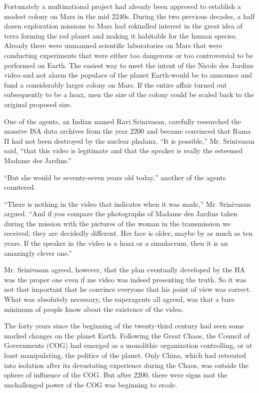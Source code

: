 \documentclass[]{article}
\begin{document}
{Fortunately a multinational project had already been approved to establish a modest colony on Mars in the mid 2240s. During the two previous decades, a half dozen exploration missions to Mars had rekindled interest in the great idea of terra forming the red planet and making it habitable for the human species. Already there were unmanned scientific laboratories on Mars that were conducting experiments that were either too dangerous or too controversial to be performed on Earth. The easiest way to meet the intent of the Nicole des Jardins video-and not alarm the populace of the planet Earth-would be to announce and fund a considerably larger colony on Mars. If the entire affair turned out subsequently to be a hoax, men the size of the colony could be scaled back to the original proposed size.

One of the agents, an Indian named Ravi Srinivasan, carefully researched the massive ISA data archives from the year 2200 and became convinced that Rama II had not been destroyed by the nuclear phalanx. “It is possible,” Mr. Srinivasan said, “that this video is legitimate and that the speaker is really the esteemed Madame des Jardins.”

“But she would be seventy-seven years old today,” another of the agents countered.

“There is nothing in the video that indicates when it was made,” Mr. Srinivasan argued. “And if you compare the photographs of Madame des Jardins taken during the mission with the pictures of the woman in the transmission we received, they are decidedly different. Her face is older, maybe by as much as ten years. If the speaker in the video is a hoax or a simulacrum, then it is an amazingly clever one.”

Mr. Srinivasan agreed, however, that the plan eventually developed by the HA was the proper one even if me video was indeed presenting the truth. So it was not that important that he convince everyone that his point of view was correct. What was absolutely necessary, the superagents all agreed, was that a bare minimum of people know about the existence of the video.

The forty years since the beginning of the twenty-third century had seen some marked changes on the planet Earth. Following the Great Chaos, the Council of Governments (COG) had emerged as a monolithic organization controlling, or at least manipulating, the politics of the planet. Only China, which had retreated into isolation after its devastating experience during the Chaos, was outside the sphere of influence of the COG. But after 2200, there were signs mat the unchallenged power of the COG was beginning to erode.

}
\end{document}
